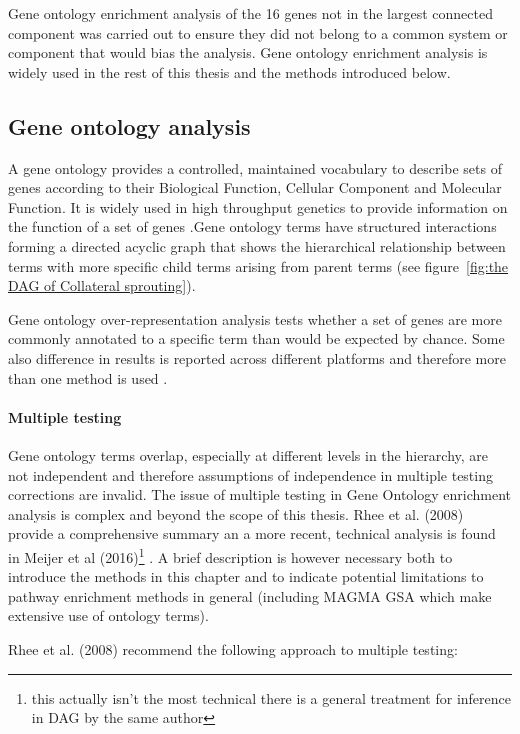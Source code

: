 Gene ontology enrichment analysis of the 16 genes not in the largest connected component was carried out to ensure they did not belong to a common system or component that would bias the analysis. Gene ontology enrichment analysis is widely used in the rest of this thesis and the methods introduced below.


\subsection{Gene ontology analysis}
\label{sec: gene ontology analysis}
A gene ontology provides a controlled, maintained vocabulary to describe sets of genes according to their Biological Function, Cellular Component and Molecular Function. It is widely used in high throughput genetics to provide information on the function of a set of genes \cite{ashburner2000gene}.Gene ontology terms have structured interactions forming a directed acyclic graph that shows the hierarchical relationship between terms with more specific child terms arising from parent terms (see figure~\ref{fig:the DAG of Collateral sprouting}).

Gene ontology over-representation analysis tests whether a set of genes are more commonly annotated to a specific term  than would be expected by chance. Some also  difference in results is reported across different platforms and therefore more than one method is used \cite{rhee2008use}\cite{khatri2005ontological}. 


\paragraph{Multiple testing}
Gene ontology terms overlap, especially at different levels in the hierarchy, are not independent and therefore assumptions of independence in multiple testing corrections are invalid. The issue of multiple testing in Gene Ontology enrichment analysis is complex and beyond the scope of this thesis. Rhee et al. (2008) \cite{rhee2008use} provide a comprehensive summary an a more recent, technical analysis is found in Meijer et al (2016)\footnote{this actually isn't the most technical there is a general treatment for inference in DAG by the same author} \cite{meijer2016multiple}. A brief description is however necessary both to introduce the methods in this chapter and to indicate potential limitations to pathway enrichment methods in general (including MAGMA GSA which make extensive use of ontology terms). 

Rhee et al. (2008) \cite{rhee2008use} recommend the following approach to multiple testing:

